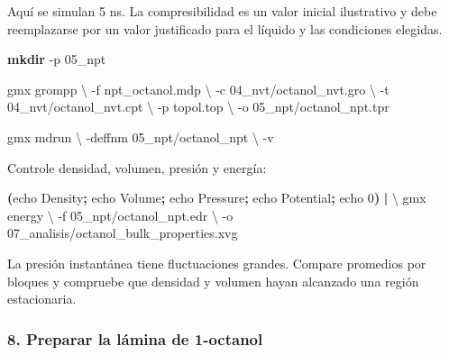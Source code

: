 \documentclass[
  spanish,
  11pt,
  a4paper]{article}
\newenvironment{Shaded}{\begin{snugshade}}{\end{snugshade}}
\newcommand{\AttributeTok}[1]{\textcolor[rgb]{0.13,0.29,0.53}{#1}}
\newcommand{\BuiltInTok}[1]{#1}
\newcommand{\DataTypeTok}[1]{\textcolor[rgb]{0.13,0.29,0.53}{#1}}
\newcommand{\ExtensionTok}[1]{#1}
\newcommand{\FunctionTok}[1]{\textcolor[rgb]{0.13,0.29,0.53}{\textbf{#1}}}
\newcommand{\KeywordTok}[1]{\textcolor[rgb]{0.13,0.29,0.53}{\textbf{#1}}}
\newcommand{\NormalTok}[1]{#1}
\begin{document}
Aquí se simulan 5 ns. La compresibilidad es un valor inicial ilustrativo
y debe reemplazarse por un valor justificado para el líquido y las
condiciones elegidas.

\begin{Shaded}
\begin{Highlighting}[]
\FunctionTok{mkdir} \AttributeTok{{-}p}\NormalTok{ 05\_npt}

\ExtensionTok{gmx}\NormalTok{ grompp }\DataTypeTok{\textbackslash{}}
    \AttributeTok{{-}f}\NormalTok{ npt\_octanol.mdp }\DataTypeTok{\textbackslash{}}
    \AttributeTok{{-}c}\NormalTok{ 04\_nvt/octanol\_nvt.gro }\DataTypeTok{\textbackslash{}}
    \AttributeTok{{-}t}\NormalTok{ 04\_nvt/octanol\_nvt.cpt }\DataTypeTok{\textbackslash{}}
    \AttributeTok{{-}p}\NormalTok{ topol.top }\DataTypeTok{\textbackslash{}}
    \AttributeTok{{-}o}\NormalTok{ 05\_npt/octanol\_npt.tpr}

\ExtensionTok{gmx}\NormalTok{ mdrun }\DataTypeTok{\textbackslash{}}
    \AttributeTok{{-}deffnm}\NormalTok{ 05\_npt/octanol\_npt }\DataTypeTok{\textbackslash{}}
    \AttributeTok{{-}v}
\end{Highlighting}
\end{Shaded}

Controle densidad, volumen, presión y energía:

\begin{Shaded}
\begin{Highlighting}[]
\KeywordTok{(}\BuiltInTok{echo}\NormalTok{ Density}\KeywordTok{;} \BuiltInTok{echo}\NormalTok{ Volume}\KeywordTok{;} \BuiltInTok{echo}\NormalTok{ Pressure}\KeywordTok{;} \BuiltInTok{echo}\NormalTok{ Potential}\KeywordTok{;} \BuiltInTok{echo}\NormalTok{ 0}\KeywordTok{)} \KeywordTok{|} \DataTypeTok{\textbackslash{}}
\ExtensionTok{gmx}\NormalTok{ energy }\DataTypeTok{\textbackslash{}}
    \AttributeTok{{-}f}\NormalTok{ 05\_npt/octanol\_npt.edr }\DataTypeTok{\textbackslash{}}
    \AttributeTok{{-}o}\NormalTok{ 07\_analisis/octanol\_bulk\_properties.xvg}
\end{Highlighting}
\end{Shaded}

La presión instantánea tiene fluctuaciones grandes. Compare promedios
por bloques y compruebe que densidad y volumen hayan alcanzado una
región estacionaria.

\subsubsection{8. Preparar la lámina de
1-octanol}\label{preparar-la-luxe1mina-de-1-octanol}
\end{document}
